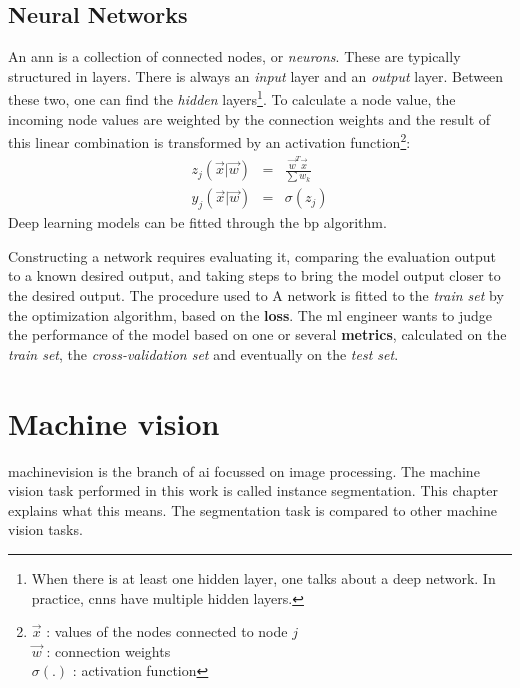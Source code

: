 \subsection{Neural Networks}
\par{
    An \acrshort{ann} is a collection of connected nodes, or \textit{neurons}. 
    These are typically structured in layers. 
    There is always an \textit{input} layer and an \textit{output} layer. Between these two, one can find the \textit{hidden} layers\footnote{When there is at least one hidden layer, one talks about a deep network. In practice, \acrshort{cnn}s have multiple hidden layers.}.
    To calculate a node value, the incoming node values are weighted by the connection weights and the result of this linear combination is transformed by an activation function\footnote{
        $\vec{x}$ : values of the nodes connected to node $j$\\
        $\vec{w}$ : connection weights\\
        $\sigma(.)$ : activation function
    }:
    \begin{eqnarray}
        z_j(\vec{x} | \vec{w}) &=& \frac{\vec{w}^T\vec{x}}{\sum w_k} \\
        y_j(\vec{x} | \vec{w}) &=& \sigma(z_j)
    \end{eqnarray}
    Deep learning models can be fitted through the \acrfull{bp} algorithm.
}


Constructing a network requires evaluating it, comparing the evaluation output to a known desired output, and taking steps to bring the model output closer to the desired output. 
The procedure used to 
A network is fitted to the \textit{train set} by the optimization algorithm, based on the \textbf{loss}.
The \acrshort{ml} engineer wants to judge the performance of the model based on one or several \textbf{metrics}, calculated on the \textit{train set}, the \textit{cross-validation set} and eventually on the \textit{test set}.

\section{Machine vision}

\Gls{machinevision} is the branch of \Gls{ai} focussed on image processing.
The machine vision task performed in this work is called instance \Gls{segmentation}.
This chapter explains what this means. 
The segmentation task is compared to other machine vision tasks.

